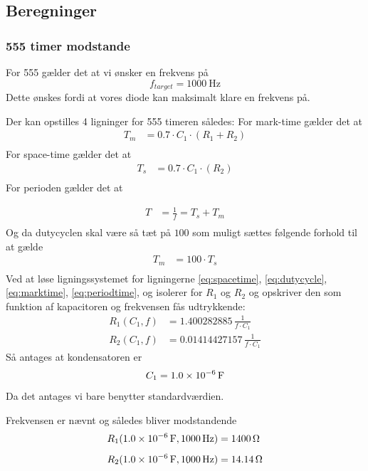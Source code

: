 \subsection{Beregninger}
\subsubsection{555 timer modstande} \label{calc:555timerResistance}
For 555 gælder det at vi ønsker en frekvens på 
\[
	f_{target} =  \SI{1000}{\hertz}
\]
Dette ønskes fordi at vores diode kan maksimalt klare en frekvens på.

Der kan opstilles 4 ligninger for 555 timeren således: 
For mark-time gælder det at
\begin{align}
	T_m &= 0.7 \cdot C_1 \cdot (R_1 + R_2) \label{eq:marktime} \\
\end{align}
For space-time gælder det at 
\begin{align}
	T_s &= 0.7 \cdot C_1 \cdot (R_2) \label{eq:spacetime} \\
\end{align}
For perioden gælder det at 

\begin{align}
	T &= \frac{1}{f} = T_s + T_m \label{eq:periodtime} \\
\end{align}
Og da dutycyclen skal være så tæt på $100$ som muligt sættes følgende forhold til at gælde
\begin{align}
	T_m &= 100 \cdot  T_s \label{eq:dutycycle} \\
\end{align}
Ved at løse ligningssystemet for ligningerne \ref{eq:spacetime}, \ref{eq:dutycycle}, \ref{eq:marktime}, \ref{eq:periodtime}, og isolerer for $R_1$ og $R_2$ og opskriver den som funktion af kapacitoren og frekvensen fås udtrykkende:
\begin{align}
	R_{1} \left( C_1,f \right) &= 1.400282885\,{\frac {1}{f \cdot C_1}} \\[2ex]
	R_{2} \left( C_1,f \right) &= 0.01414427157\,{\frac {1}{f \cdot C_1}}
\end{align}
Så antages at kondensatoren er 
\[
	C_1 = \SI{1.0d-6}{\farad}
\]
Da det antages vi bare benytter standardværdien. 

Frekvensen er nævnt og således bliver modstandende
\begin{align}
	R_1(\SI{1.0d-6}{\farad},\SI{1000}{\hertz})&= \SI{1400}{\ohm} \\[1ex]
	R_2(\SI{1.0d-6}{\farad},\SI{1000}{\hertz})&= \SI{14.14}{\ohm}
\end{align}

